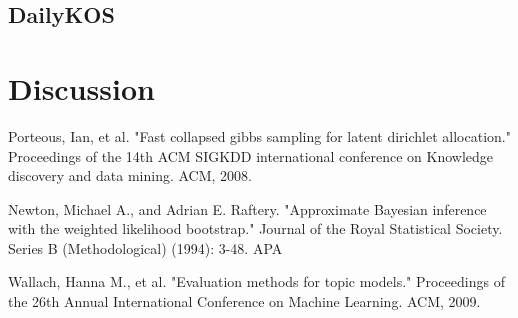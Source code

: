 \documentclass[twoside,12pt]{article}
\begin{document}
\subsection{DailyKOS}

\section{Discussion}



\begin{thebibliography}{9}
Porteous, Ian, et al. "Fast collapsed gibbs sampling for latent dirichlet allocation." Proceedings of the 14th ACM SIGKDD international conference on Knowledge discovery and data mining. ACM, 2008.


Newton, Michael A., and Adrian E. Raftery. "Approximate Bayesian inference with the weighted likelihood bootstrap." Journal of the Royal Statistical Society. Series B (Methodological) (1994): 3-48.
APA	

Wallach, Hanna M., et al. "Evaluation methods for topic models." Proceedings of the 26th Annual International Conference on Machine Learning. ACM, 2009.

\end{thebibliography}
\end{document}
